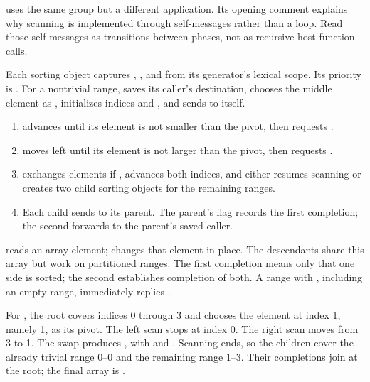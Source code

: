  uses the same group but a different application.
Its opening comment explains why scanning is implemented through
self-messages rather than a  loop. Read those self-messages
as transitions between phases, not as recursive host function calls.

Each sorting object captures , , and
 from its generator's lexical scope. Its priority is
. For a nontrivial range, 
saves its caller's destination, chooses the middle element as
, initializes indices  and , and sends
 to itself.

\begin{enumerate}
  \item {} advances  until its element is
        not smaller than the pivot, then requests .
  \item {} moves  left until its element
        is not larger than the pivot, then requests .
  \item {} exchanges elements if ,
        advances both indices, and either resumes scanning or creates
        two child sorting objects for the remaining ranges.
  \item Each child sends  to its parent. The parent's
         flag records the first completion; the second
        forwards  to the parent's saved caller.
\end{enumerate}

 reads an array element;  changes that element
in place. The descendants share this array but work on partitioned
ranges. The first completion means only that one side is sorted;
the second establishes completion of both. A range with
, including an empty range, immediately replies
.


For , the root covers indices 0 through 3 and
chooses the element at index 1, namely 1, as its pivot.
The left scan stops at index 0. The right scan moves from 3 to 1.
The swap produces , with  and
. Scanning ends, so the children cover the already
trivial range 0--0 and the remaining range 1--3. Their completions
join at the root; the final array is .

